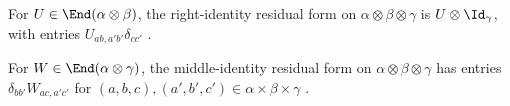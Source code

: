 \begin{definition}%
    \label{def:peps_threeLegRightIdentityForm}
    \leanok
    For $U\in\End(\alpha\otimes\beta)$, the right-identity residual form on
    $\alpha\otimes\beta\otimes\gamma$ is $U\otimes\Id_\gamma$, with entries
    $U_{ab,a'b'}\delta_{cc'}$ \cite[Section~3]{Molnar2018NormalPEPS}.
\end{definition}

\begin{definition}%
    \label{def:peps_threeLegMiddleIdentityForm}
    \leanok
    For $W\in\End(\alpha\otimes\gamma)$, the middle-identity residual form on
    $\alpha\otimes\beta\otimes\gamma$ has entries $\delta_{bb'}W_{ac,a'c'}$
    for $(a,b,c),(a',b',c')\in\alpha\times\beta\times\gamma$
    \cite[Section~3]{Molnar2018NormalPEPS}.
\end{definition}

